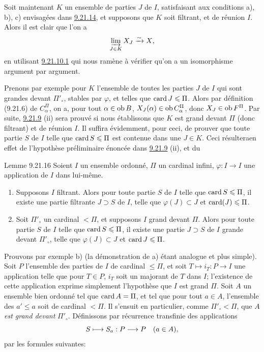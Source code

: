 \documentclass[10pt]{../fichiers-configuration-latex/smfart}
\def\labelenumi{(\theenumi)}
\begin{document}
\setcounter{subsection}{21} \setcounter{subsubsection}{14}
\subsubsection{}
Soit maintenant $K$ un ensemble de parties $J$ de $I$, satisfaisant
aux conditions a), b), c) envisagées dans \hyperref[I.sec9.21.14]{9.21.14}, et
supposons que
$K$ soit filtrant, et de réunion $I$. Alors il est clair que l'on a
$$
\varinjlim_{J\in K}X_J\xrightarrow{\sim}X{},
$$
en utilisant \hyperref[I.cor9.21.10.1]{9.21.10.1} qui nous ramène à
vérifier qu'on a un
isomorphisme argument par argument.

Prenons par exemple pour $K$ l'ensemble de toutes les parties $J$ de
$I$ qui sont grandes devant $\Pi'_\circ$, stables par $\varphi$, et
telles que $\operatorname{card} J\leqslant \Pi$. Alors par définition (9.21.6) de
$C^{\Pi}_{\alpha}$, on a, pour tout $\alpha\in \operatorname{ob} B$,
$X_J(\alpha)\in \operatorname{ob} C^{\Pi}_{\alpha}$, donc $X_J\in \operatorname{ob} F^{\Pi}$.
Par suite, \hyperref[I.lem9.21.9]{9.21.9} (ii) sera prouvé si nous
établissons que $K$ est
grand devant $\Pi$ (donc filtrant) et de réunion $I$. Il suffira
évidemment, pour ceci, de prouver que toute partie $S$ de $I$ telle
que $\operatorname{card} S\leqslant \Pi$ est contenue dans une $J\in K$. Ceci
résultera\pageoriginale en effet de l'hypothèse
préliminaire énoncée
dans \hyperref[I.lem9.21.9]{9.21.9} (ii), et du

\begin{enonce*}{Lemme 9.21.16}
Soient $I$ un ensemble ordonné, $\Pi$ un cardinal infini,
$\varphi:I\rightarrow I$ une application de $I$ dans lui-même.
\begin{enumerate}
\renewcommand{\theenumi}{\alph{enumi}}
\renewcommand{\labelenumi}{\theenumi)}
\item Supposons $I$ filtrant. Alors pour toute partie $S$ de $I$ telle
que $\operatorname{card} S\leqslant \Pi$, il existe une partie filtrante $J\supset S$
de $I$, telle que $\varphi(J)\subset J$ et $\operatorname{card}(J)\leqslant \Pi$.

\item Soit $\Pi'_{\circ}$ un cardinal $<\Pi$, et supposons $I$ grand
devant $\Pi$. Alors pour toute partie $S$ de $I$ telle que $\operatorname{card}
S\leqslant \Pi$, il existe une partie $J\supset S$ de $I$ grande devant
$\Pi'_{\circ}$, telle que $\varphi(J)\subset J$ et $\operatorname{card} J\leqslant
\Pi$.
\end{enumerate}
\end{enonce*}

Prouvons par exemple b) (la démonstration de a) étant analogue et
plus simple). Soit $P$ l'ensemble des parties de $I$ de cardinal
$\leq \Pi$, et soit $T\mapsto i_T:P\rightarrow I$ une application
telle que pour $T\in P$, $i_T$ soit un majorant de $T$ dans $I$;
l'existence de cette application exprime simplement l'hypothèse que
$I$ est grand $\Pi$. Soit $A$ un ensemble bien ordonné tel que
$\operatorname{card} A=\Pi$, et tel que pour tout $a\in A$, l'ensemble des $a'\leq
a$ soit de cardinal $<\Pi$. Il s'ensuit en particulier, comme
$\Pi'_{\circ}<\Pi$, que $A$ \emph{est grand devant} $\Pi'_{\circ}$.
Définissons par récurrence transfinie des applications
$$
S\longmapsto S_a: P\longrightarrow P\quad(a\in A){},
$$
par les formules suivantes:
\end{document}
